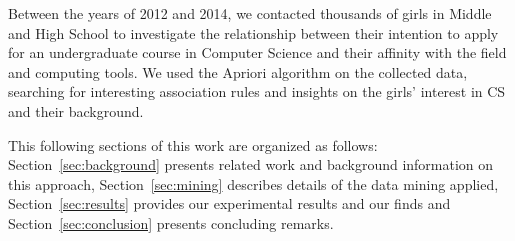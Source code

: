 %

Between the years of 2012 and 2014, we contacted thousands of girls in Middle and High School to investigate the relationship between their intention to apply for an undergraduate course in Computer Science and their affinity with the field and computing tools. We used the Apriori algorithm on the collected data, searching for interesting association rules and insights on the girls' interest in CS and their background.

This following sections of this work are organized as follows: Section~\ref{sec:background} presents related work and background information on this approach, Section~\ref{sec:mining} describes details of the data mining applied, Section~\ref{sec:results} provides our experimental results and our finds and Section~\ref{sec:conclusion} presents concluding remarks.
